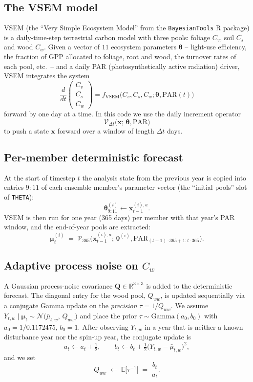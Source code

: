 \documentclass[11pt]{article}
\newcommand{\R}{\mathbb{R}}
\newcommand{\E}{\mathbb{E}}
\newcommand{\inv}{^{-1}}
\begin{document}
\subsection{The VSEM model}

VSEM (the ``Very Simple Ecosystem Model'' from the \texttt{BayesianTools}
R package) is a daily-time-step terrestrial carbon model with three
pools: foliage $C_v$, soil $C_s$ and wood $C_w$.  Given a vector of
$11$ ecosystem parameters $\bm\theta$ -- light-use efficiency, the
fraction of GPP allocated to foliage, root and wood, the turnover rates
of each pool, etc.\ -- and a daily PAR (photosynthetically active
radiation) driver, VSEM integrates the system
\[
  \frac{d}{dt}
  \begin{pmatrix} C_v \\ C_s \\ C_w \end{pmatrix}
  =
  f_{\mathrm{VSEM}}\!\bigl(C_v, C_s, C_w; \bm\theta,
                            \mathrm{PAR}(t)\bigr)
\]
forward by one day at a time.  In this code we use the daily increment
operator
\[
  \mathcal V_{\Delta t}\!\bigl(\bm x;\,\bm\theta,
                                \mathrm{PAR}\bigr)
\]
to push a state $\bm x$ forward over a window of length $\Delta t$ days.

\subsection{Per-member deterministic forecast}

At the start of timestep $t$ the analysis state from the previous year is
copied into entries $9{:}11$ of each ensemble member's parameter vector
(the ``initial pools'' slot of \texttt{THETA}):
\[
  \bm\theta^{(i)}_{9:11} \leftarrow \bm x^{(i),a}_{t-1}.
\]
VSEM is then run for one year (365 days) per member with that year's
PAR window, and the end-of-year pools are extracted:
\[
  \bm \mu^{(i)}_t
  \;=\;
  \mathcal V_{365}\!\bigl(\bm x^{(i),a}_{t-1};\,
                          \bm\theta^{(i)},
                          \mathrm{PAR}_{(t-1)\cdot 365 + 1 : t\cdot 365}
                    \bigr).
\]

\subsection{Adaptive process noise on $C_w$}

A Gaussian process-noise covariance $\bm Q \in \R^{3\times 3}$ is added
to the deterministic forecast.  The diagonal entry for the wood pool,
$Q_{ww}$, is updated sequentially via a conjugate Gamma update on the
\emph{precision} $\tau = 1/Q_{ww}$.  We assume
$Y_{t,w} \mid \bm \mu_t \sim
 \mathcal N\!\bigl(\bar\mu_{t,w},\, Q_{ww}\bigr)$
and place the prior
$\tau \sim \mathrm{Gamma}(a_0, b_0)$
with $a_0 = 1/0.1172475$, $b_0 = 1$.  After observing
$Y_{t,w}$ in a year that is neither a known disturbance year nor the
spin-up year, the conjugate update is
\[
  a_t \leftarrow a_t + \tfrac12,
  \qquad
  b_t \leftarrow b_t + \tfrac12 \bigl(Y_{t,w} - \bar\mu_{t,w}\bigr)^2,
\]
and we set
\[
  Q_{ww} \;\leftarrow\; \E\!\bigl[\tau\inv\bigr] \;=\; \frac{b_t}{a_t}.
\]
\end{document}
